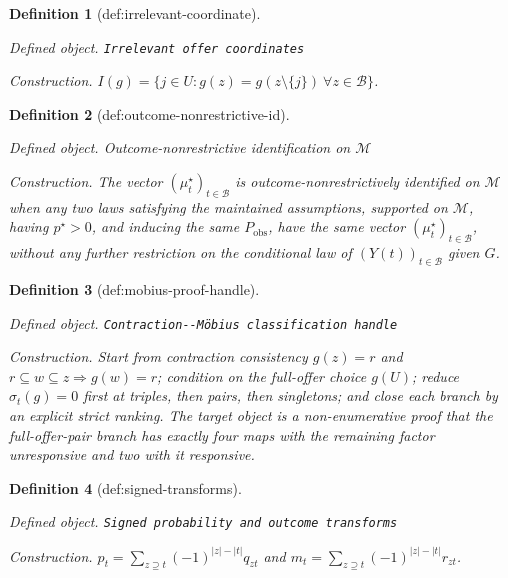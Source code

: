\documentclass{article}
\newtheorem{definition}{Definition}
\begin{document}
\begin{definition}[def:irrelevant-coordinate]\label{def:irrelevant-coordinate}
\par\smallskip\noindent\emph{Defined object.} \texttt{Irrelevant offer coordinates}
\par\smallskip\noindent\emph{Construction.} \(I(g)=\{j\in U:g(z)=g(z\setminus\{j\})\ \forall z\in\mathcal B\}\).
\end{definition}

\begin{definition}[def:outcome-nonrestrictive-id]\label{def:outcome-nonrestrictive-id}
\par\smallskip\noindent\emph{Defined object.} Outcome-nonrestrictive identification on \(\mathcal M\)
\par\smallskip\noindent\emph{Construction.} The vector \((\mu_t^\star)_{t\in\mathcal B}\) is outcome-nonrestrictively identified on \(\mathcal M\) when any two laws satisfying the maintained assumptions, supported on \(\mathcal M\), having \(p^\star>0\), and inducing the same \(P_{\mathrm{obs}}\), have the same vector \((\mu_t^\star)_{t\in\mathcal B}\), without any further restriction on the conditional law of \((Y(t))_{t\in\mathcal B}\) given \(G\).
\end{definition}

\begin{definition}[def:mobius-proof-handle]\label{def:mobius-proof-handle}
\par\smallskip\noindent\emph{Defined object.} \texttt{Contraction-\allowbreak{}-\allowbreak{}Möbius classification handle}
\par\smallskip\noindent\emph{Construction.} Start from contraction consistency \(g(z)=r\) and \(r\subseteq w\subseteq z\Rightarrow g(w)=r\); condition on the full-offer choice \(g(U)\); reduce \(\sigma_t(g)=0\) first at triples, then pairs, then singletons; and close each branch by an explicit strict ranking. The target object is a non-enumerative proof that the full-offer-pair branch has exactly four maps with the remaining factor unresponsive and two with it responsive.
\end{definition}

\begin{definition}[def:signed-transforms]\label{def:signed-transforms}
\par\smallskip\noindent\emph{Defined object.} \texttt{Signed probability and outcome transforms}
\par\smallskip\noindent\emph{Construction.} \(p_t=\sum_{z\supseteq t}(-1)^{|z|-|t|}q_{zt}\) and \(m_t=\sum_{z\supseteq t}(-1)^{|z|-|t|}r_{zt}\).
\end{definition}
\end{document}
